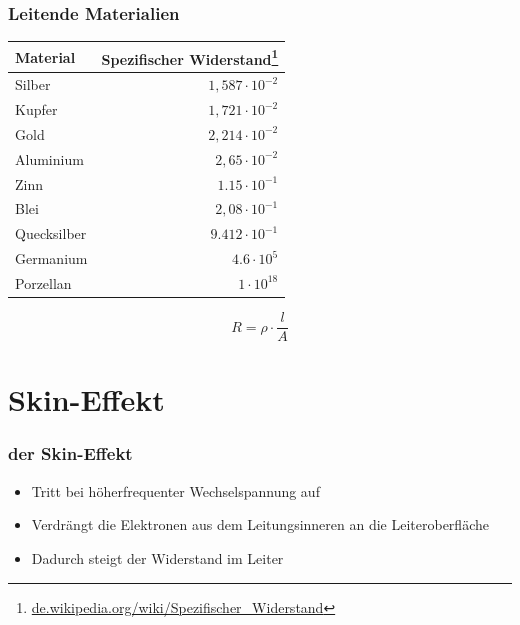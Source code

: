 \begin{frame}
    \frametitle{Leitende Materialien}

     \begin{tabular}{lr}
  	Material & Spezifischer Widerstand\footnote{\tiny \url{de.wikipedia.org/wiki/Spezifischer_Widerstand}} \\ \hline
  	Silber & $1,587 \cdot 10^{-2}$ \\
  	Kupfer & $1,721 \cdot 10^{-2}$ \\
  	Gold & $2,214 \cdot 10^{-2}$ \\
  	Aluminium & $2,65 \cdot 10^{-2}$ \\
  	Zinn & $1.15 \cdot 10^{-1}$ \\
  	Blei & $2,08 \cdot 10^{-1}$ \\
  	Quecksilber & $9.412 \cdot 10^{-1}$ \\
  	Germanium & $4.6 \cdot 10^{5}$\\
  	Porzellan & $1 \cdot 10^{18}$ \\
 	\end{tabular}
 	
 	\begin{center}
 	  \begin{Large}
 	    $$R = \rho \cdot \frac{l}{A}$$
 	  \end{Large}
 	\end{center}
 	
\end{frame}

\section{Skin-Effekt}
\begin{frame}
  \frametitle{der Skin-Effekt}
  \begin{itemize}
    \item Tritt bei höherfrequenter Wechselspannung auf
    \item Verdrängt die Elektronen aus dem Leitungsinneren an die Leiteroberfläche
    \item Dadurch steigt der Widerstand im Leiter
    
  \end{itemize}

\end{frame}

